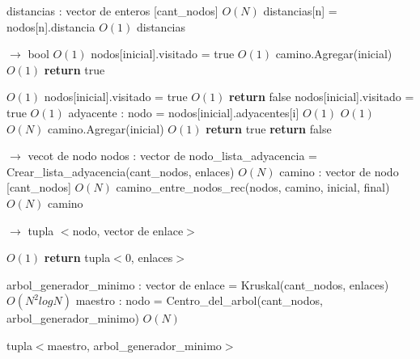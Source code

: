 \documentclass[a4paper, 10pt, twoside]{article}
\newenvironment{pseudo}[1][]{%
    \vspace{0.5em}%
    \begin{algorithmic}%
}
{%
    \end{algorithmic}%
    \vspace{0.5em}%
}
\newcommand{\Ode}[1]{\hfill $O(#1)$}
\begin{document}
\begin{pseudo}
  \State distancias : vector de enteros [cant\_nodos]             \Ode{N}
    \State distancias[n] = nodos[n].distancia               \Ode{1}
  \EndFor
  \Return distancias
\EndProcedure

 $\rightarrow$ bool
                                 \Ode{1}
        \State nodos[inicial].visitado = true                   \Ode{1}
        \State camino.Agregar(inicial)                        \Ode{1}
        \State \textbf{return} true
    \EndIf

                       \Ode{1}
        \State nodos[inicial].visitado = true                   \Ode{1}
        \State \textbf{return} false
    \Else
        \State nodos[inicial].visitado = true                   \Ode{1}
          \State adyacente : nodo = nodos[inicial].adyacentes[i]          \Ode{1}
                                 \Ode{1}
                   \Ode{N}
                    \State camino.Agregar(inicial)                  \Ode{1}
                    \textbf{return} true
                \EndIf
            \EndIf
        \EndFor
        \State \textbf{return} false
    \EndIf
\EndProcedure

 $\rightarrow$ vecot de nodo
    \State nodos : vector de nodo\_lista\_adyacencia = Crear\_lista\_adyacencia(cant\_nodos, enlaces) \Ode{N}
    \State camino : vector de nodo [cant\_nodos]                      \Ode{N}
    \State camino\_entre\_nodos\_rec(nodos, camino, inicial, final)             \Ode{N}
    \Return camino
\EndProcedure


 $\rightarrow$ tupla $<$nodo, vector de enlace$>$

                                 \Ode{1}
    \State \textbf{return} tupla$<$0, enlaces$>$
  \EndIf

  \State arbol\_generador\_minimo : vector de enlace = Kruskal(cant\_nodos, enlaces) \Ode{N^2 log N}
  \State maestro : nodo = Centro\_del\_arbol(cant\_nodos, arbol\_generador\_minimo) \Ode{N}

    \Return tupla$<$maestro, arbol\_generador\_minimo$>$
\EndProcedure
\end{pseudo}
\end{document}
